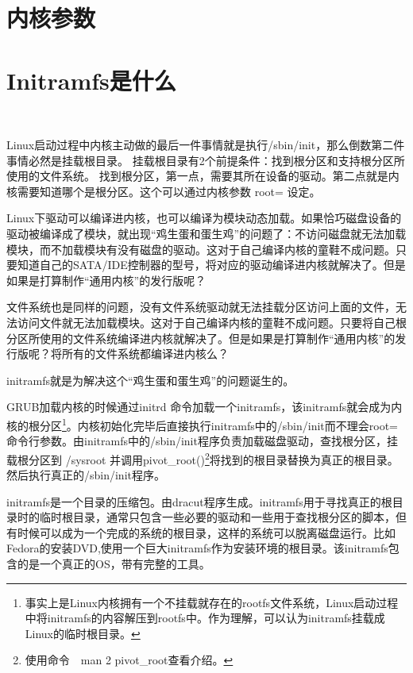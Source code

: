 \section{内核参数}\label{FAQ：kernelparamter}



\section{Initramfs是什么}　\label{FAQ:initramfs}

Linux启动过程中内核主动做的最后一件事情就是执行/sbin/init，那么倒数第二件事情必然是挂载根目录。
挂载根目录有2个前提条件：找到根分区和支持根分区所使用的文件系统。
找到根分区，第一点，需要其所在设备的驱动。第二点就是内核需要知道哪个是根分区。这个可以通过内核参数 root= 设定。

Linux下驱动可以编译进内核，也可以编译为模块动态加载。如果恰巧磁盘设备的驱动被编译成了模块，就出现“鸡生蛋和蛋生鸡”的问题了：不访问磁盘就无法加载模块，而不加载模块有没有磁盘的驱动。这对于自己编译内核的童鞋不成问题。只要知道自己的SATA/IDE控制器的型号，将对应的驱动编译进内核就解决了。但是如果是打算制作“通用内核”的发行版呢？

文件系统也是同样的问题，没有文件系统驱动就无法挂载分区访问上面的文件，无法访问文件就无法加载模块。这对于自己编译内核的童鞋不成问题。只要将自己根分区所使用的文件系统编译进内核就解决了。但是如果是打算制作“通用内核”的发行版呢？将所有的文件系统都编译进内核么？

initramfs就是为解决这个“鸡生蛋和蛋生鸡”的问题诞生的。

GRUB加载内核的时候通过initrd 命令加载一个initramfs，该initramfs就会成为内核的根分区\footnote{事实上是Linux内核拥有一个不挂载就存在的rootfs文件系统，Linux启动过程中将initramfs的内容解压到rootfs中。作为理解，可以认为initramfs挂载成Linux的临时根目录。}。内核初始化完毕后直接执行initramfs中的/sbin/init而不理会root=命令行参数。由initramfs中的/sbin/init程序负责加载磁盘驱动，查找根分区，挂载根分区到 /sysroot 并调用pivot\_root()\footnote{使用命令　man 2 pivot\_root查看介绍。}将找到的根目录替换为真正的根目录。然后执行真正的/sbin/init程序。

initramfs是一个目录的压缩包。由dracut程序生成。initramfs用于寻找真正的根目录时的临时根目录，通常只包含一些必要的驱动和一些用于查找根分区的脚本，但有时候可以成为一个完成的系统的根目录，这样的系统可以脱离磁盘运行。比如Fedora的安装DVD,使用一个巨大initramfs作为安装环境的根目录。该initramfs包含的是一个真正的OS，带有完整的工具。

